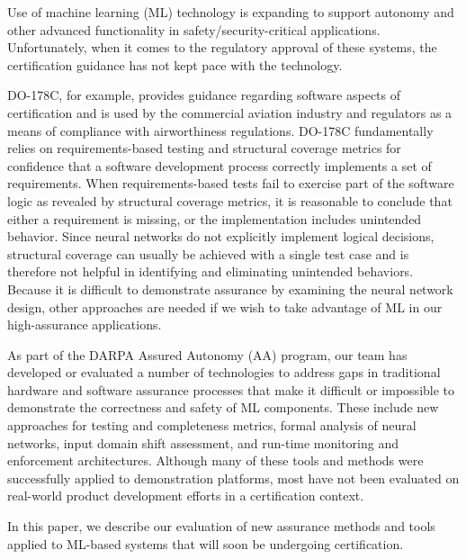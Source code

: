 Use of machine learning (ML) technology is expanding to support autonomy and other advanced functionality in safety/security-critical applications.  Unfortunately, when it comes to the regulatory approval of these systems, the certification guidance has not kept pace with the technology.

DO-178C, for example, provides guidance regarding software aspects of certification and is used by the commercial aviation industry and regulators as a means of compliance with airworthiness regulations. DO-178C fundamentally relies on requirements-based testing and structural coverage metrics for confidence that a software development process correctly implements a set of requirements. When requirements-based tests fail to exercise part of the software logic as revealed by structural coverage metrics, it is reasonable to conclude that either a requirement is missing, or the implementation includes unintended behavior. Since neural networks do not explicitly implement logical decisions, structural coverage can usually be achieved with a single test case and is therefore not helpful in identifying and eliminating unintended behaviors.  Because it is difficult to demonstrate assurance by examining the neural network design, other approaches are needed if we wish to take advantage of ML in our high-assurance applications.

As part of the DARPA Assured Autonomy (AA) program, our team has developed or evaluated a number of technologies to address gaps in traditional hardware and software assurance processes that make it difficult or impossible to demonstrate the correctness and safety of ML components.    These include new approaches for testing and completeness metrics, formal analysis of neural networks, input domain shift assessment, and run-time monitoring and enforcement architectures.  Although many of these tools and methods were successfully applied to demonstration platforms, most have not been evaluated on real-world product development efforts in a certification context. 

In this paper, we describe our evaluation of new assurance methods and tools applied to ML-based systems that will soon be undergoing certification.